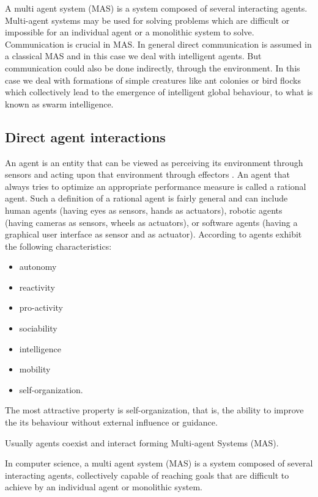 A multi agent system (MAS) is a system composed of several interacting agents. Multi-agent systems may be used for solving problems which are difficult or impossible for an individual agent or a monolithic system to solve. Communication is crucial in MAS. In general direct communication is assumed in a classical MAS and in this case we deal with intelligent agents. But communication could also be done indirectly, through the environment. In this case we deal with formations of simple creatures like ant colonies or bird flocks which collectively lead to the emergence of intelligent global behaviour, to what is known as swarm intelligence.

\subsection{Direct agent interactions}

An agent is an entity that can be viewed as perceiving its environment through sensors and acting upon that environment through effectors \cite{Serban04Tehnici}. An agent that always tries to optimize an appropriate performance measure is called a rational agent. Such a definition of a rational agent is fairly general and can include human agents (having eyes as sensors, hands as actuators), robotic agents (having cameras as sensors, wheels as actuators), or software agents (having a graphical user interface as sensor and as actuator).
According to \cite{Serban04Tehnici, Serban06Sisteme} agents exhibit the following characteristics: 
\begin{itemize}
\item autonomy
\item reactivity
\item pro-activity
\item sociability
\item intelligence
\item mobility
\item self-organization.
\end{itemize}

The most attractive property is self-organization, that is, the ability to improve the its behaviour without external influence or guidance.

Usually agents coexist and interact forming Multi-agent Systems (MAS). 

\begin{definition}
In computer science, a multi agent system (MAS) is a system composed of several interacting agents, collectively capable of reaching goals that are difficult to achieve by an individual agent or monolithic system.
\end{definition}


